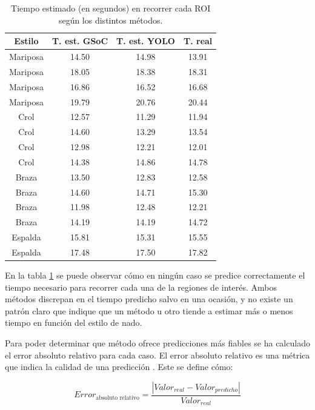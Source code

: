 \begin{table}[]
    \centering
    \small
    \begin{tabular}{|c|c|c|c|} \hline
         Estilo & T. est. GSoC & T. est. YOLO & T. real  \\ \hline  
         Mariposa & 14.50 & 14.98 & 13.91  \\   
         Mariposa & 18.05 & 18.38 & 18.31 \\    
         Mariposa & 16.86 & 16.52 & 16.68 \\    
         Mariposa & 19.79 & 20.76 & 20.44 \\    
         Crol & 12.57 & 11.29 & 11.94  \\      
         Crol & 14.60 & 13.29 & 13.54 \\        
         Crol & 12.98 & 12.21 & 12.01 \\       
         Crol & 14.38 & 14.86 & 14.78 \\        
         Braza & 13.50 & 12.83 & 12.58 \\       
         Braza & 14.60 & 14.71 & 15.30 \\      
         Braza & 11.98 & 12.48 & 12.21  \\      
         Braza & 14.19 & 14.19 & 14.72  \\      
         Espalda & 15.81 & 15.31 & 15.55 \\    
         Espalda & 17.48 & 17.50 & 17.82 \\ \hline 
    \end{tabular}
    \caption{Tiempo estimado (en segundos) en recorrer cada ROI según los distintos métodos.}
    \label{tab:tablatiemposcap5}
\end{table} 

En la tabla \ref{tab:tablatiemposcap5} se puede observar cómo en ningún caso se predice correctamente el tiempo necesario para recorrer cada una de la regiones de interés. Ambos métodos discrepan en el tiempo predicho salvo en una ocasión, y no existe un patrón claro que indique que un método u otro tiende a estimar más o menos tiempo en función del estilo de nado. 

Para poder determinar que método ofrece predicciones más fiables se ha calculado el error absoluto relativo para cada caso. El error absoluto relativo es una métrica que indica la calidad de una predicción \cite{estadistica}. Este se define cómo:

\begin{equation}
    Error_{\text{absoluto relativo}} = \frac{|Valor_{real} - Valor_{predicho}|}{Valor_{real}}
\end{equation}

